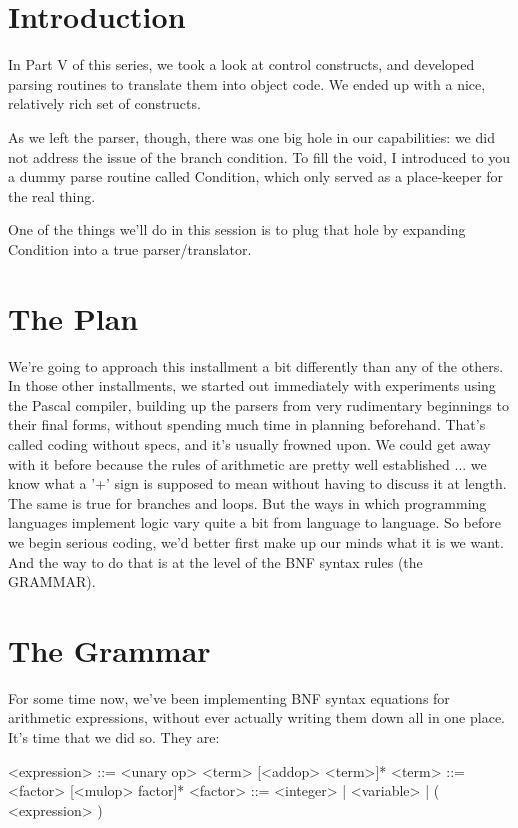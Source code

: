 \documentclass[float=false, crop=false]{standalone}
\begin{document}
\section{Introduction}

In Part V of this series, we took a look at control constructs, and developed
parsing routines to translate them into object code. We ended up with a nice,
relatively rich set of constructs.

As we left the parser, though, there was one big hole in our capabilities: we
did not address the issue of the branch condition. To fill the void, I
introduced to you a dummy parse routine called Condition, which only served as a
place-keeper for the real thing.

One of the things we'll do in this session is to plug that hole by expanding
Condition into a true parser/translator.

\section{The Plan}

We're going to approach this installment a bit differently than any of the
others. In those other installments, we started out immediately with experiments
using the Pascal compiler, building up the parsers from very rudimentary
beginnings to their final forms, without spending much time in planning
beforehand. That's called coding without specs, and it's usually frowned upon.
We could get away with it before because the rules of arithmetic are pretty well
established ... we know what a '+' sign is supposed to mean without having to
discuss it at length. The same is true for branches and loops. But the ways in
which programming languages implement logic vary quite a bit from language to
language. So before we begin serious coding, we'd better first make up our minds
what it is we want. And the way to do that is at the level of the BNF syntax
rules (the GRAMMAR).

\section{The Grammar}

For some time now, we've been implementing BNF syntax equations for arithmetic
expressions, without ever actually writing them down all in one place. It's time
that we did so. They are:


     <expression> ::= <unary op> <term> [<addop> <term>]*
     <term>       ::= <factor> [<mulop> factor]*
     <factor>     ::= <integer> | <variable> | ( <expression> )
\end{document}

